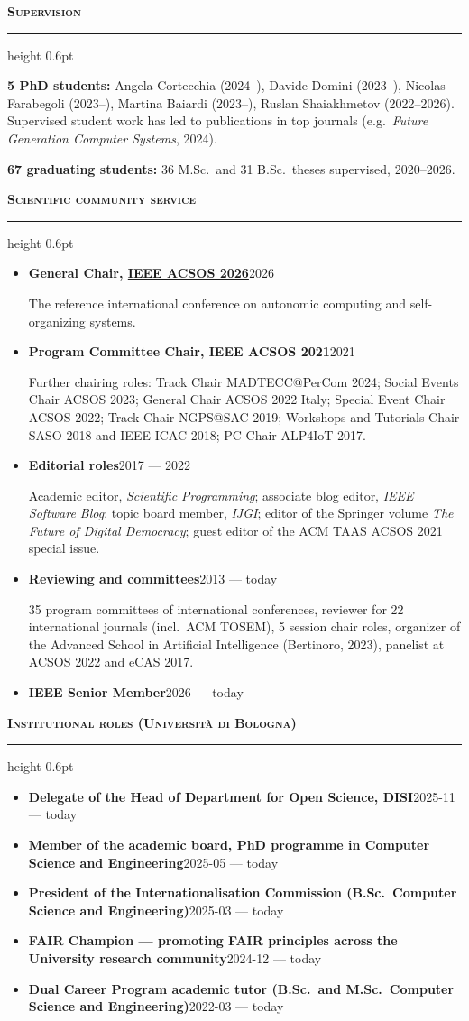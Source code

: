 \documentclass[a4paper,9pt]{extarticle}
\newcommand{\cvsection}[1]{%
  \par\vspace{3.5pt}%
  {\normalsize\bfseries\scshape #1}\par\vspace{1pt}%
  \hrule height 0.6pt\vspace{2.5pt}\par}
\newcommand{\entry}[2]{\textbf{#1}\hspace{1em}\hfill{\small #2}\par}
\begin{document}
\cvsection{Supervision}
\textbf{5 PhD students:}
Angela Cortecchia (2024--), Davide Domini (2023--), Nicolas Farabegoli (2023--),
Martina Baiardi (2023--), Ruslan Shaiakhmetov (2022--2026).
Supervised student work has led to publications in top journals (e.g.\ \emph{Future
Generation Computer Systems}, 2024).\par
\vspace{1pt}
\textbf{67 graduating students:} 36 M.Sc.\ and 31 B.Sc.\ theses supervised, 2020--2026.

\cvsection{Scientific community service}
\begin{itemize}
\item \entry{General Chair, \href{https://2026.acsos.org/}{IEEE ACSOS 2026}}{2026}
      The reference international conference on autonomic computing and self-organizing systems.
\item \entry{Program Committee Chair, IEEE ACSOS 2021}{2021}
      Further chairing roles: Track Chair MADTECC@PerCom 2024; Social Events Chair ACSOS 2023;
      General Chair ACSOS 2022 Italy; Special Event Chair ACSOS 2022; Track Chair NGPS@SAC 2019;
      Workshops and Tutorials Chair SASO 2018 and IEEE ICAC 2018; PC Chair ALP4IoT 2017.
\item \entry{Editorial roles}{2017 --- 2022}
      Academic editor, \emph{Scientific Programming}; associate blog editor, \emph{IEEE Software
      Blog}; topic board member, \emph{IJGI}; editor of the Springer volume \emph{The Future of
      Digital Democracy}; guest editor of the ACM TAAS ACSOS 2021 special issue.
\item \entry{Reviewing and committees}{2013 --- today}
      35 program committees of international conferences, reviewer for 22 international journals
      (incl.\ ACM TOSEM), 5 session chair roles, organizer of the Advanced School in Artificial
      Intelligence (Bertinoro, 2023), panelist at ACSOS 2022 and eCAS 2017.
\item \entry{IEEE Senior Member}{2026 --- today}
\end{itemize}

\cvsection{Institutional roles (Universit\`a di Bologna)}
\begin{itemize}
\item \entry{Delegate of the Head of Department for Open Science, DISI}{2025-11 --- today}
\item \entry{Member of the academic board, PhD programme in Computer Science and Engineering}{2025-05 --- today}
\item \entry{President of the Internationalisation Commission (B.Sc.\ Computer Science and Engineering)}{2025-03 --- today}
\item \entry{FAIR Champion --- promoting FAIR principles across the University research community}{2024-12 --- today}
\item \entry{Dual Career Program academic tutor (B.Sc.\ and M.Sc.\ Computer Science and Engineering)}{2022-03 --- today}
\end{itemize}
\end{document}
